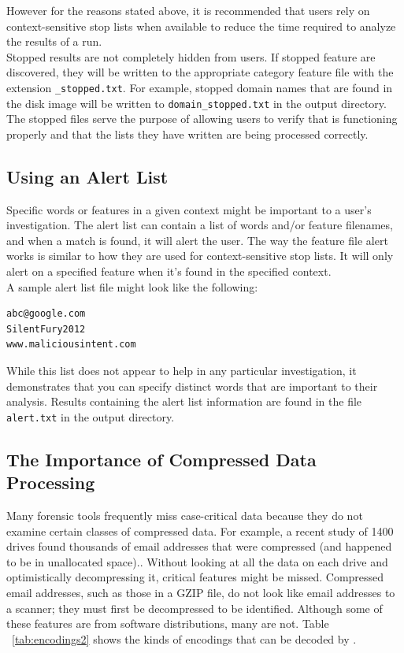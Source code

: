 \documentclass[11pt]{article} %
\begin{document}
However for the reasons stated above, it is recommended that users rely on context-sensitive stop lists when available to reduce the time required to analyze the results of a \bulk run.\\

Stopped results are not completely hidden from users. If stopped feature are discovered, they will be written to the appropriate category feature file with the extension \texttt{\_stopped.txt}. For example, stopped domain names that are found in the disk image will be written to \texttt{domain\_stopped.txt} in the output directory. The stopped files serve the purpose of allowing users to verify that \bulk is functioning properly and that the lists they have written are being processed correctly.

\subsection{Using an Alert List}
Specific words or features in a given context might be important to a user's investigation. The alert list can contain a list of words and/or feature filenames, and when a match is found, it will alert the user. The way the feature file alert works is similar to how they are used for context-sensitive stop lists. It will only alert on a specified feature when it's found in the specified context.\\

A sample alert list file might look like the following:
\begin{verbatim}
abc@google.com
SilentFury2012
www.maliciousintent.com
\end{verbatim}

While this list does not appear to help in any particular investigation, it demonstrates that you can specify distinct words that are important to their analysis. Results containing the alert list information are found in the file \texttt{alert.txt} in the \bulk output directory.

\subsection{The Importance of Compressed Data Processing}
\label{compressedProcessing}

Many forensic tools frequently miss case-critical data because they do not examine certain classes of compressed data. For example, a recent study of 1400 drives found thousands of email addresses that were compressed (and happened to be in unallocated space).\cite{encodedEvidence}. Without looking at all the data on each drive and optimistically decompressing it, critical features might be missed. Compressed email addresses, such as those in a GZIP file, do not look like email addresses to a scanner; they must first be decompressed to be identified. Although some of these features are from software distributions, many are not. Table ~\ref{tab:encodings2} shows the kinds of encodings that can be decoded by \bulk \cite{encodedEvidence}.
\end{document}
